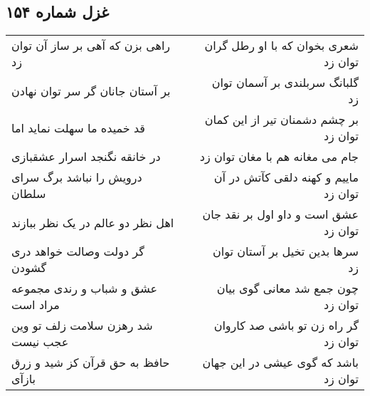 \begin{center}
\section*{غزل شماره ۱۵۴}
\label{sec:sh154}
\begin{longtable}{l p{0.5cm} r}
راهی بزن که آهی بر ساز آن توان زد
&&
شعری بخوان که با او رطل گران توان زد
\\
بر آستان جانان گر سر توان نهادن
&&
گلبانگ سربلندی بر آسمان توان زد
\\
قد خمیده ما سهلت نماید اما
&&
بر چشم دشمنان تیر از این کمان توان زد
\\
در خانقه نگنجد اسرار عشقبازی
&&
جام می مغانه هم با مغان توان زد
\\
درویش را نباشد برگ سرای سلطان
&&
ماییم و کهنه دلقی کآتش در آن توان زد
\\
اهل نظر دو عالم در یک نظر ببازند
&&
عشق است و داو اول بر نقد جان توان زد
\\
گر دولت وصالت خواهد دری گشودن
&&
سرها بدین تخیل بر آستان توان زد
\\
عشق و شباب و رندی مجموعه مراد است
&&
چون جمع شد معانی گوی بیان توان زد
\\
شد رهزن سلامت زلف تو وین عجب نیست
&&
گر راه زن تو باشی صد کاروان توان زد
\\
حافظ به حق قرآن کز شید و زرق بازآی
&&
باشد که گوی عیشی در این جهان توان زد
\\
\end{longtable}
\end{center}
